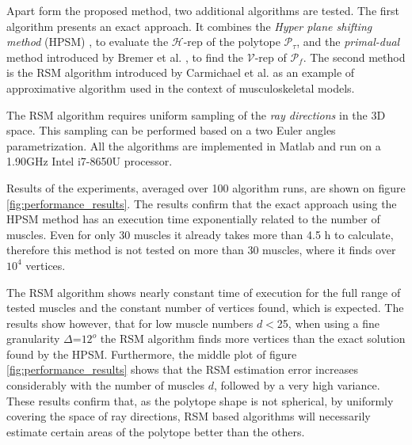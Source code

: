 Apart form the proposed method, two additional algorithms are tested. The first algorithm presents an exact approach. It combines the \textit{Hyper plane shifting method} (HPSM) \cite{hyper_psm}, to evaluate the $\mathcal{H}$-rep of the polytope $\mathcal{P}_\tau$, and the \textit{primal-dual} method introduced by Bremer et al. \cite{bremner_fukuda_marzetta_1998}, to find the $\mathcal{V}$-rep of $\mathcal{P}_f$. The second method is the RSM algorithm introduced by Carmichael et al. \cite{carmichael2011Towards} as an example of approximative algorithm used in the context of musculoskeletal models.

The RSM algorithm \cite{carmichael2011Towards} requires uniform sampling of the \textit{ray directions} in the 3D space. This sampling can be performed based on a two Euler angles parametrization.  All the algorithms are implemented in Matlab and run on a 1.90GHz Intel i7-8650U processor.

Results of the experiments, averaged over 100 algorithm runs, are shown on figure \ref{fig:performance_results}. The results confirm that the exact approach using the HPSM method has an execution time exponentially related to the number of muscles. Even for only 30 muscles it already takes more than 4.5 h to calculate, therefore this method is not tested on more than 30 muscles, where it finds over $10^4$ vertices.  

The RSM algorithm shows nearly constant time of execution for the full range of tested muscles and the constant number of vertices found, which is expected. The results show however, that for low muscle numbers $d\!<$25, when using a fine granularity $\Delta$=$12^o$ the RSM algorithm finds more vertices than the exact solution found by the HPSM. Furthermore, the middle plot of figure \ref{fig:performance_results} shows that the RSM estimation error increases considerably with the number of muscles $d$, followed by a very
high variance. These results confirm that, as the polytope shape is not spherical, by uniformly covering the space of ray directions, RSM based algorithms will necessarily estimate certain areas of the polytope better than the others.

